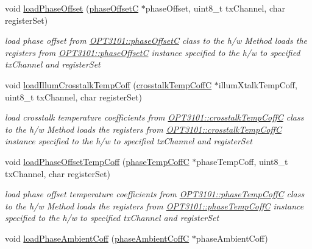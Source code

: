 \begin{DoxyCompactItemize}
void \mbox{\hyperlink{class_o_p_t3101_1_1device_a941591aefa8b4c9b7436ac8f216938ed}{load\+Phase\+Offset}} (\mbox{\hyperlink{class_o_p_t3101_1_1phase_offset_c}{phase\+OffsetC}} $\ast$phase\+Offset, uint8\+\_\+t tx\+Channel, char register\+Set)
\begin{DoxyCompactList}\small\item\em load phase offset from \mbox{\hyperlink{class_o_p_t3101_1_1phase_offset_c}{O\+P\+T3101\+::phase\+OffsetC}} class to the h/w Method loads the registers from \mbox{\hyperlink{class_o_p_t3101_1_1phase_offset_c}{O\+P\+T3101\+::phase\+OffsetC}} instance specified to the h/w to specified tx\+Channel and register\+Set \end{DoxyCompactList}\item 
void \mbox{\hyperlink{class_o_p_t3101_1_1device_a450bc6b5bcd3e6b232d4352229a2829c}{load\+Illum\+Crosstalk\+Temp\+Coff}} (\mbox{\hyperlink{class_o_p_t3101_1_1crosstalk_temp_coff_c}{crosstalk\+Temp\+CoffC}} $\ast$illum\+Xtalk\+Temp\+Coff, uint8\+\_\+t tx\+Channel, char register\+Set)
\begin{DoxyCompactList}\small\item\em load crosstalk temperature coefficients from \mbox{\hyperlink{class_o_p_t3101_1_1crosstalk_temp_coff_c}{O\+P\+T3101\+::crosstalk\+Temp\+CoffC}} class to the h/w Method loads the registers from \mbox{\hyperlink{class_o_p_t3101_1_1crosstalk_temp_coff_c}{O\+P\+T3101\+::crosstalk\+Temp\+CoffC}} instance specified to the h/w to specified tx\+Channel and register\+Set \end{DoxyCompactList}\item 
void \mbox{\hyperlink{class_o_p_t3101_1_1device_a71e7ec6f26d54ea7cba11bf1c4132489}{load\+Phase\+Offset\+Temp\+Coff}} (\mbox{\hyperlink{class_o_p_t3101_1_1phase_temp_coff_c}{phase\+Temp\+CoffC}} $\ast$phase\+Temp\+Coff, uint8\+\_\+t tx\+Channel, char register\+Set)
\begin{DoxyCompactList}\small\item\em load phase offset temperature coefficients from \mbox{\hyperlink{class_o_p_t3101_1_1phase_temp_coff_c}{O\+P\+T3101\+::phase\+Temp\+CoffC}} class to the h/w Method loads the registers from \mbox{\hyperlink{class_o_p_t3101_1_1phase_temp_coff_c}{O\+P\+T3101\+::phase\+Temp\+CoffC}} instance specified to the h/w to specified tx\+Channel and register\+Set \end{DoxyCompactList}\item 
void \mbox{\hyperlink{class_o_p_t3101_1_1device_aa34206319a66be86de29789a1c24e3f7}{load\+Phase\+Ambient\+Coff}} (\mbox{\hyperlink{class_o_p_t3101_1_1phase_ambient_coff_c}{phase\+Ambient\+CoffC}} $\ast$phase\+Ambient\+Coff)

\end{DoxyCompactItemize}
